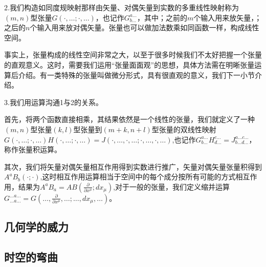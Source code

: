 \documentclass{article}
\begin{document}
2.我们构造如同度规映射那样由矢量、对偶矢量到实数的多重线性映射称为$(m,n)$型张量$G(\cdot,\dots;\cdot,\dots)$，也记作$G^{a\dots}_{b\dots}$，其中；之前的$m$个输入用来放矢量，；之后的$n$个输入用来放对偶矢量。张量也可以做加法数乘如同函数一样，构成线性空间。

事实上，张量构成的线性空间非常之大，以至于很多时候我们不太好把握一个张量的直观意义。这时，需要我们运用“张量面面观”的思想，具体方法需在明晰张量运算后介绍。有一类特殊的张量叫做微分形式，具有很直观的意义，我们下一小节介绍。

3.我们用运算沟通1与2的关系。

首先，将两个函数直接相乘，其结果依然是一个线性的张量，我们就定义了一种$(m,n)$型张量$(k,l)$型张量到$(m+k,n+l)$型张量的双线性映射$G(\cdot,\dots;\cdot,\dots)H(\cdot,\dots;\cdot,\dots)=J(\cdot,\dots,\cdot,\dots;\cdot,\dots,\cdot,\dots)$,也记作$G^{a\dots}_{b\dots}H^{c\dots}_{d\dots}=J^{a\dots c\dots}_{b\dots d\dots}$，称作张量积运算。

其次，我们将矢量对偶矢量相互作用得到实数进行推广，矢量对偶矢量张量积得到$A^aB_b(\cdot;\cdot)$,这时相互作用运算相当于空间中的每个成分按所有可能的方式相互作用，结果为$A^aB_a=AB(\frac{\partial}{\partial x^\mu };dx_\mu)$,对于一般的张量，我们定义缩并运算$G^{\dots a \dots}_{\dots a \dots}=G(\dots,\frac{\partial}{\partial x^\mu },\dots;\dots,dx_\mu,\dots)$。
\subsection{几何学的威力}
\subsection{时空的弯曲}
\end{document}
